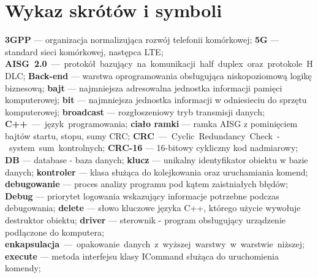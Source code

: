 \chapter*{Wykaz skrótów i symboli}
\noindent
\textbf{3GPP} --- organizacja normalizująca rozwój telefonii komórkowej;\newline
\textbf{5G} --- standard sieci komórkowej, następca LTE;\newline
\textbf{AISG 2.0} --- protokół bazujący na komunikacji half duplex oraz protokole HDLC;\newline
\textbf{Back-end} --- warstwa oprogramowania obsługująca niskopoziomową logikę biznesową;\newline
\textbf{bajt} --- najmniejsza adresowalna jednostka informacji pamięci komputerowej;\newline
\textbf{bit} --- najmniejsza jednostka informacji w odniesieciu do sprzętu komputerowej;\newline
\textbf{broadcast} --- rozgłoszeniowy tryb transmisji danych;\newline
\textbf{C++} --- język programowania;\newline
\textbf{ciało ramki} --- ramka AISG z pominięciem bajtów startu, stopu, sumy CRC;\newline
\textbf{CRC} --- Cyclic Redundancy Check - system sum kontrolnych;\newline
\textbf{CRC-16} --- 16-bitowy cykliczny kod nadmiarowy;\newline
\textbf{DB} --- database - baza danych;\newline
\textbf{klucz} --- unikalny identyfikator obiektu w bazie danych;\newline
\textbf{kontroler} --- klasa służąca do kolejkowania oraz uruchamiania komend;\newline
\textbf{debugowanie} --- proces analizy programu pod kątem zaistniałych błędów;\newline
\textbf{Debug} --- priorytet logowania wskazujący informacje potrzebne podczas debugowania;\newline
\textbf{delete} --- słowo kluczowe języka C++, którego użycie wywołuje destruktor obiektu;\newline
\textbf{driver} --- sterownik - program obsługujący urządzenie podłączone do komputera;\newline
\textbf{enkapsulacja} --- opakowanie danych z wyższej warstwy w warstwie niższej;\newline
\textbf{execute} --- metoda interfejsu klasy ICommand służąca do uruchomienia komendy;\newline

